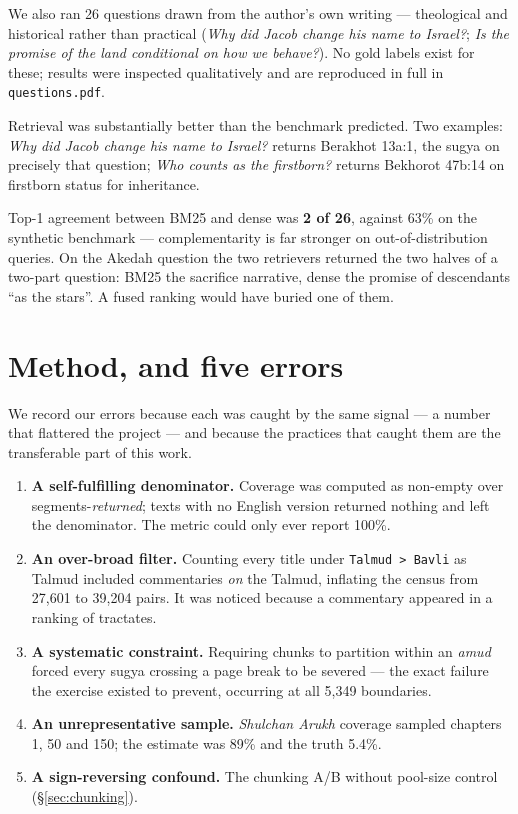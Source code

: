 \documentclass[11pt,a4paper]{article}
\begin{document}
We also ran 26 questions drawn from the author's own writing --- theological and
historical rather than practical (\emph{Why did Jacob change his name to
Israel?}; \emph{Is the promise of the land conditional on how we behave?}). No
gold labels exist for these; results were inspected qualitatively and are
reproduced in full in \texttt{questions.pdf}.

Retrieval was substantially better than the benchmark predicted. Two examples:
\emph{Why did Jacob change his name to Israel?} returns Berakhot 13a:1, the sugya
on precisely that question; \emph{Who counts as the firstborn?} returns Bekhorot
47b:14 on firstborn status for inheritance.

Top-1 agreement between BM25 and dense was \textbf{2 of 26}, against 63\% on the
synthetic benchmark --- complementarity is far stronger on out-of-distribution
queries. On the Akedah question the two retrievers returned the two halves of a
two-part question: BM25 the sacrifice narrative, dense the promise of
descendants ``as the stars''. A fused ranking would have buried one of them.

\section{Method, and five errors}\label{sec:method}

We record our errors because each was caught by the same signal --- a number that
flattered the project --- and because the practices that caught them are the
transferable part of this work.

\begin{enumerate}[itemsep=3pt]
\item \textbf{A self-fulfilling denominator.} Coverage was computed as
      non-empty over segments-\emph{returned}; texts with no English version
      returned nothing and left the denominator. The metric could only ever
      report 100\%.
\item \textbf{An over-broad filter.} Counting every title under
      \texttt{Talmud > Bavli} as Talmud included commentaries \emph{on} the
      Talmud, inflating the census from 27{,}601 to 39{,}204 pairs. It was
      noticed because a commentary appeared in a ranking of tractates.
\item \textbf{A systematic constraint.} Requiring chunks to partition within an
      \emph{amud} forced every sugya crossing a page break to be severed --- the
      exact failure the exercise existed to prevent, occurring at all 5{,}349
      boundaries.
\item \textbf{An unrepresentative sample.} \emph{Shulchan Arukh} coverage
      sampled chapters 1, 50 and 150; the estimate was 89\% and the truth 5.4\%.
\item \textbf{A sign-reversing confound.} The chunking A/B without pool-size
      control (\S\ref{sec:chunking}).
\end{enumerate}
\end{document}
